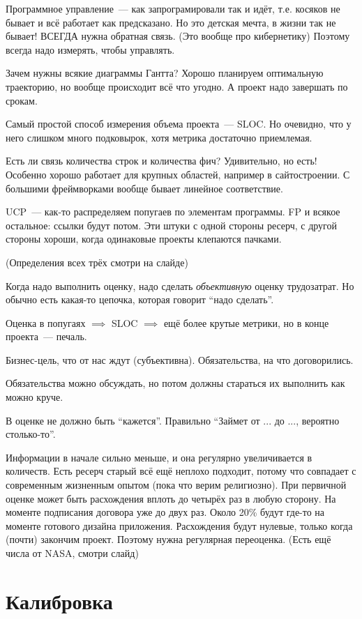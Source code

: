 \documentclass[12pt, a4paper, oneside]{memoir}
\begin{document}
Программное управление~--- как запрограмировали так и идёт, т.е. косяков не бывает и всё работает как предсказано.
Но это детская мечта, в жизни так не бывает!
ВСЕГДА нужна обратная связь.
(Это вообще про кибернетику)
Поэтому всегда надо измерять, чтобы управлять.

Зачем нужны всякие диаграммы Гантта?
Хорошо планируем оптимальную траекторию, но вообще происходит всё что угодно.
А проект надо завершать по срокам.

Самый простой способ измерения объема проекта~--- SLOC.
Но очевидно, что у него слишком много подковырок, хотя метрика достаточно приемлемая.

Есть ли связь количества строк и количества фич?
Удивительно, но есть!
Особенно хорошо работает для крупных областей, например в сайтостроении.
С большими фреймворками вообще бывает линейное соответствие.

UCP~--- как-то распределяем попугаев по элементам программы.
FP и всякое остальное: ссылки будут потом.
Эти штуки с одной стороны ресерч, с другой стороны хороши, когда одинаковые проекты клепаются пачками.

(Определения всех трёх смотри на слайде)

Когда надо выполнить оценку, надо сделать \textit{объективную} оценку трудозатрат.
Но обычно есть какая-то цепочка, которая говорит \enquote{надо сделать}.

Оценка  в попугаях $\implies$ SLOC $\implies$ ещё более крутые метрики, но в конце проекта~--- печаль.

Бизнес-цель, что от нас ждут (субъективна).
Обязательства, на что договорились.

Обязательства можно обсуждать, но потом должны стараться их выполнить как можно круче.

В оценке не должно быть \enquote{кажется}.
Правильно \enquote{Займет от ... до ..., вероятно столько-то}.

Информации в начале сильно меньше, и она регулярно увеличивается в количеств.
Есть ресерч старый всё ещё неплохо подходит, потому что совпадает с современным жизненным опытом (пока что верим религиозно).
При первичной оценке может быть расхождения вплоть до четырёх раз в любую сторону.
На моменте подписания договора уже до двух раз.
Около 20\% будут где-то на моменте готового дизайна приложения.
Расхождения будут нулевые, только когда (почти) закончим проект.
Поэтому нужна регулярная переоценка.
(Есть ещё числа от NASA, смотри слайд)

\section*{Калибровка}
\end{document}

